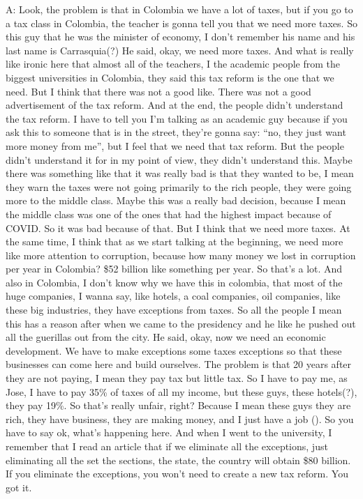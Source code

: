 \documentclass{phyasgn}\usepackage{nag}
\begin{document}
A: Look, the problem is that in Colombia we have a lot of taxes, but if you go to a tax class in Colombia, the teacher is gonna tell you that we need more taxes. So this guy that he was the minister of economy, I don't remember his name and his last name is Carrasquia(?) He said, okay, we need more taxes. And what is really like ironic here that almost all of the teachers, I the academic people from the biggest universities in Colombia, they said this tax reform is the one that we need. But I think that there was not a good like. There was not a good advertisement of the tax reform. And at the end, the people didn't understand the tax reform. I have to tell you I'm talking as an academic guy because if you ask this to someone that is in the street, they're gonna say: “no, they just want more money from me”, but I feel that we need that tax reform. But the people didn't understand it for in my point of view, they didn't understand this. Maybe there was something like that it was really bad is that they wanted to be, I mean they warn the taxes were not going primarily to the rich people, they were going more to the middle class. Maybe this was a really bad decision, because I mean the middle class was one of the ones that had the highest impact because of COVID. So it was bad because of that. But I think that we need more taxes. At the same time, I think that as we start talking at the beginning, we need more like more attention to corruption, because how many money we lost in corruption per year in Colombia? \$52 billion like something per year. So that's a lot. And also in Colombia, I don't know why we have this in colombia, that most of the huge companies, I wanna say, like hotels, a coal companies, oil companies, like these big industries, they have exceptions from taxes. So all the people I mean this has a reason after when we came to the presidency and he like he pushed out all the guerillas out from the city. He said, okay, now we need an economic development. We have to make exceptions some taxes exceptions so that these businesses can come here and build ourselves. The problem is that 20 years after they are not paying, I mean they pay tax but little tax. So I have to pay me, as Jose, I have to pay 35\% of taxes of all my income, but these guys, these hotels(?), they pay 19\%. So that's really unfair, right? Because I mean these guys they are rich, they have business, they are making money, and I just have a job (). So you have to say ok, what's happening here. And when I went to the university, I remember that I read an article that if we eliminate all the exceptions, just eliminating all the set the sections, the state, the country will obtain \$80 billion. If you eliminate the exceptions, you won't need to create a new tax reform. You got it.\\
\end{document}
